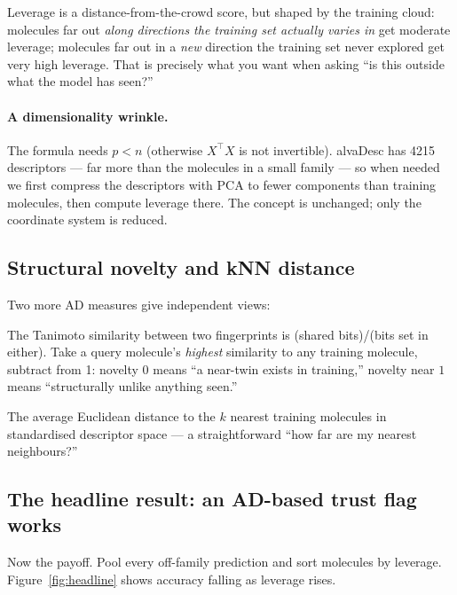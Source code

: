 \documentclass[11pt]{article}
\newenvironment{callout}[2][blue]{%
  \par\smallskip\colorlet{shadecolor}{#1!7}%
  \begin{shaded}\noindent{\color{#1!55!black}\bfseries #2.\ }\ignorespaces}%
  {\end{shaded}\smallskip}
\begin{document}
\begin{callout}[teal]{Intuition}
Leverage is a distance-from-the-crowd score, but shaped by the training cloud:
molecules far out \emph{along directions the training set actually varies in} get
moderate leverage; molecules far out in a \emph{new} direction the training set
never explored get very high leverage. That is precisely what you want when asking
``is this outside what the model has seen?''
\end{callout}

\paragraph{A dimensionality wrinkle.} The formula needs $p<n$ (otherwise
$X^\top X$ is not invertible). alvaDesc has 4215 descriptors --- far more than the
molecules in a small family --- so when needed we first compress the descriptors
with PCA to fewer components than training molecules, then compute leverage there.
The concept is unchanged; only the coordinate system is reduced.

\subsection{Structural novelty and kNN distance}
Two more AD measures give independent views:
\begin{description}[leftmargin=1.6em,style=nextline]
  \item[Novelty $= 1 - \max$ ECFP4 Tanimoto.] The Tanimoto similarity between two
    fingerprints is (shared bits)/(bits set in either). Take a query molecule's
    \emph{highest} similarity to any training molecule, subtract from 1: novelty
    $0$ means ``a near-twin exists in training,'' novelty near $1$ means
    ``structurally unlike anything seen.''
  \item[kNN distance.] The average Euclidean distance to the $k$ nearest training
    molecules in standardised descriptor space --- a straightforward ``how far are
    my nearest neighbours?''
\end{description}

\subsection{The headline result: an AD-based trust flag works}
Now the payoff. Pool every off-family prediction and sort molecules by leverage.
Figure~\ref{fig:headline} shows accuracy falling as leverage rises.
\end{document}
